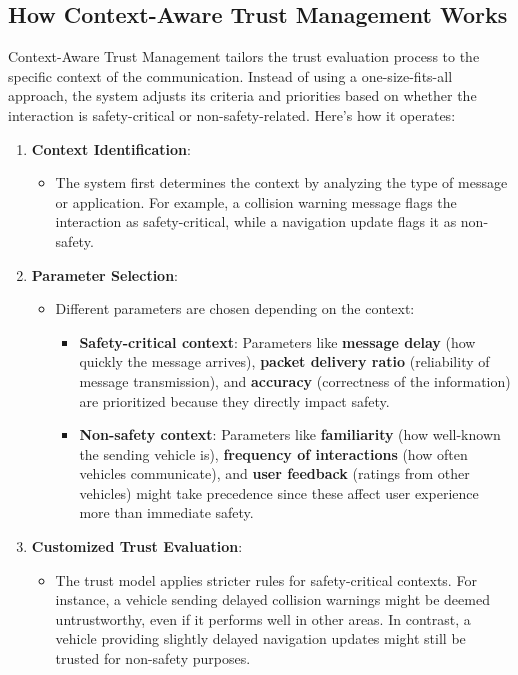 \documentclass{article}
\begin{document}
\subsection*{How Context-Aware Trust Management Works}
Context-Aware Trust Management tailors the trust evaluation process to the specific context of the communication. Instead of using a one-size-fits-all approach, the system adjusts its criteria and priorities based on whether the interaction is safety-critical or non-safety-related. Here’s how it operates:

\begin{enumerate}
    \item \textbf{Context Identification}:
    \begin{itemize}
        \item The system first determines the context by analyzing the type of message or application. For example, a collision warning message flags the interaction as safety-critical, while a navigation update flags it as non-safety.
    \end{itemize}
    
    \item \textbf{Parameter Selection}:
    \begin{itemize}
        \item Different parameters are chosen depending on the context:
        \begin{itemize}
            \item \textbf{Safety-critical context}: Parameters like \textbf{message delay} (how quickly the message arrives), \textbf{packet delivery ratio} (reliability of message transmission), and \textbf{accuracy} (correctness of the information) are prioritized because they directly impact safety.
            \item \textbf{Non-safety context}: Parameters like \textbf{familiarity} (how well-known the sending vehicle is), \textbf{frequency of interactions} (how often vehicles communicate), and \textbf{user feedback} (ratings from other vehicles) might take precedence since these affect user experience more than immediate safety.
        \end{itemize}
    \end{itemize}
    
    \item \textbf{Customized Trust Evaluation}:
    \begin{itemize}
        \item The trust model applies stricter rules for safety-critical contexts. For instance, a vehicle sending delayed collision warnings might be deemed untrustworthy, even if it performs well in other areas. In contrast, a vehicle providing slightly delayed navigation updates might still be trusted for non-safety purposes.
    \end{itemize}
\end{enumerate}
\end{document}
